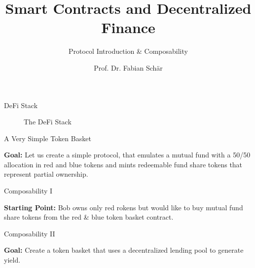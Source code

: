 \documentclass[]{beamer}
\title{Smart Contracts and Decentralized Finance}
\subtitle{Protocol Introduction \& Composability}
\author{Prof. Dr. Fabian Schär}
\institute{University of Basel}
\begin{document}
\thispagestyle{empty}
\begin{frame}[noframenumbering]
	\titlepage
\end{frame}

\begin{frame}{DeFi Stack}
	\begin{figure}
	\scalebox{0.7}{
	\begin{tikzpicture}
	
	\end{tikzpicture}
	}
	\caption{The DeFi Stack \cite{FS:21}}
\end{figure}
\end{frame}


\begin{frame}{A Very Simple Token Basket}

\textbf{Goal:} Let us create a simple protocol, that emulates a mutual fund with a 50/50 allocation in red and blue tokens and mints redeemable fund share tokens that represent partial ownership. \\ \vspace{1em}
	
\begin{figure}
	\begin{tikzpicture}
		
	\end{tikzpicture}	
\end{figure}

\end{frame}


\begin{frame}{Composability I}

\textbf{Starting Point:} Bob owns only red rokens but would like to buy mutual fund share tokens from the red \& blue token basket contract. \\ \vspace{1em}

\begin{figure}
	\begin{tikzpicture}
		
	\end{tikzpicture}
\end{figure}
	
\end{frame}


\begin{frame}{Composability II}

\textbf{Goal:} Create a token basket that uses a decentralized lending pool to generate yield. \\ 
	
\begin{figure}
	\begin{tikzpicture}
		
	\end{tikzpicture}
\end{figure}

\end{frame}
\end{document}
